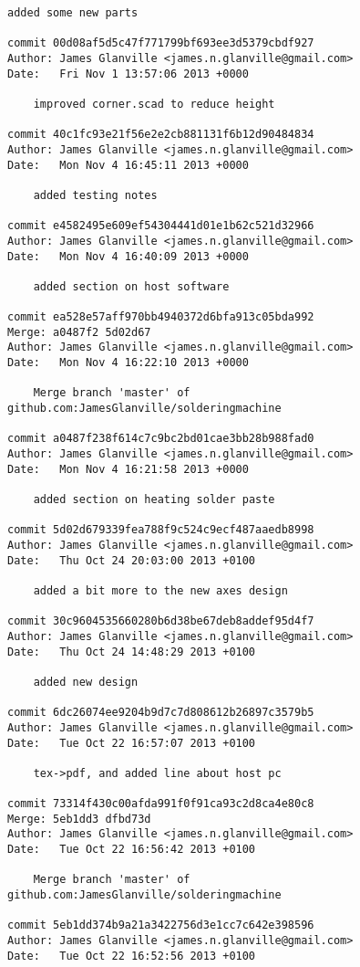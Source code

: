 \documentclass[a4paper,11pt]{article}  %
\begin{document}
\begin{lstlisting}[frame=single]
    added some new parts

commit 00d08af5d5c47f771799bf693ee3d5379cbdf927
Author: James Glanville <james.n.glanville@gmail.com>
Date:   Fri Nov 1 13:57:06 2013 +0000

    improved corner.scad to reduce height

commit 40c1fc93e21f56e2e2cb881131f6b12d90484834
Author: James Glanville <james.n.glanville@gmail.com>
Date:   Mon Nov 4 16:45:11 2013 +0000

    added testing notes

commit e4582495e609ef54304441d01e1b62c521d32966
Author: James Glanville <james.n.glanville@gmail.com>
Date:   Mon Nov 4 16:40:09 2013 +0000

    added section on host software

commit ea528e57aff970bb4940372d6bfa913c05bda992
Merge: a0487f2 5d02d67
Author: James Glanville <james.n.glanville@gmail.com>
Date:   Mon Nov 4 16:22:10 2013 +0000

    Merge branch 'master' of github.com:JamesGlanville/solderingmachine

commit a0487f238f614c7c9bc2bd01cae3bb28b988fad0
Author: James Glanville <james.n.glanville@gmail.com>
Date:   Mon Nov 4 16:21:58 2013 +0000

    added section on heating solder paste

commit 5d02d679339fea788f9c524c9ecf487aaedb8998
Author: James Glanville <james.n.glanville@gmail.com>
Date:   Thu Oct 24 20:03:00 2013 +0100

    added a bit more to the new axes design

commit 30c9604535660280b6d38be67deb8addef95d4f7
Author: James Glanville <james.n.glanville@gmail.com>
Date:   Thu Oct 24 14:48:29 2013 +0100

    added new design

commit 6dc26074ee9204b9d7c7d808612b26897c3579b5
Author: James Glanville <james.n.glanville@gmail.com>
Date:   Tue Oct 22 16:57:07 2013 +0100

    tex->pdf, and added line about host pc

commit 73314f430c00afda991f0f91ca93c2d8ca4e80c8
Merge: 5eb1dd3 dfbd73d
Author: James Glanville <james.n.glanville@gmail.com>
Date:   Tue Oct 22 16:56:42 2013 +0100

    Merge branch 'master' of github.com:JamesGlanville/solderingmachine

commit 5eb1dd374b9a21a3422756d3e1cc7c642e398596
Author: James Glanville <james.n.glanville@gmail.com>
Date:   Tue Oct 22 16:52:56 2013 +0100


\end{lstlisting}
\end{document}
